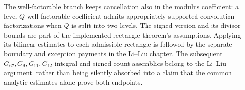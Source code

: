 The well-factorable branch keeps cancellation also in the modulus
coefficient: a level-$Q$ well-factorable coefficient admits appropriately
supported convolution factorizations when $Q$ is split into two levels.
The signed version and its divisor bounds are part of the implemented
rectangle theorem's assumptions. Applying its bilinear estimates to each
admissible rectangle is followed by the separate boundary and exception
payments in the Li--Liu chapter.
The subsequent $G_{67},G_9,G_{11},G_{12}$ integral and signed-count assemblies
belong to the Li--Liu argument, rather than being silently absorbed into a
claim that the common analytic estimates alone prove both endpoints.
